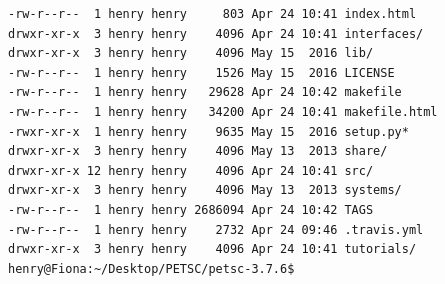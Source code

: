 \documentclass{article}
\begin{document}
\begin{enumerate}
\begin{verbatim}
-rw-r--r--  1 henry henry     803 Apr 24 10:41 index.html
drwxr-xr-x  3 henry henry    4096 Apr 24 10:41 interfaces/
drwxr-xr-x  3 henry henry    4096 May 15  2016 lib/
-rw-r--r--  1 henry henry    1526 May 15  2016 LICENSE
-rw-r--r--  1 henry henry   29628 Apr 24 10:42 makefile
-rw-r--r--  1 henry henry   34200 Apr 24 10:41 makefile.html
-rwxr-xr-x  1 henry henry    9635 May 15  2016 setup.py*
drwxr-xr-x  3 henry henry    4096 May 13  2013 share/
drwxr-xr-x 12 henry henry    4096 Apr 24 10:41 src/
drwxr-xr-x  3 henry henry    4096 May 13  2013 systems/
-rw-r--r--  1 henry henry 2686094 Apr 24 10:42 TAGS
-rw-r--r--  1 henry henry    2732 Apr 24 09:46 .travis.yml
drwxr-xr-x  3 henry henry    4096 Apr 24 10:41 tutorials/
henry@Fiona:~/Desktop/PETSC/petsc-3.7.6$ 
\end{verbatim}
\normalsize


\end{enumerate}
\end{document}
